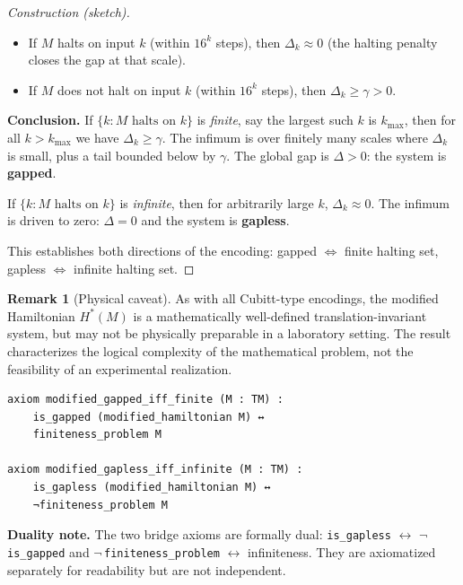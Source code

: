 \documentclass[11pt,a4paper]{article}
\theoremstyle{plain}
\theoremstyle{definition}
\newtheorem{remark}[theorem]{Remark}
\begin{document}
\begin{proof}[Construction (sketch)]
\begin{itemize}[nosep]
\item If $M$ halts on input $k$ (within $16^k$ steps),
  then $\Delta_k \approx 0$ (the halting penalty closes
  the gap at that scale).
\item If $M$ does not halt on input $k$ (within $16^k$ steps),
  then $\Delta_k \geq \gamma > 0$.
\end{itemize}

\medskip\noindent
\textbf{Conclusion.}
If $\{k : M \text{ halts on } k\}$ is \emph{finite},
say the largest such $k$ is $k_{\max}$, then for all
$k > k_{\max}$ we have $\Delta_k \geq \gamma$.
The infimum is over finitely many scales where
$\Delta_k$ is small, plus a tail bounded below by $\gamma$.
The global gap is $\Delta > 0$: the system is \textbf{gapped}.

If $\{k : M \text{ halts on } k\}$ is \emph{infinite}, then
for arbitrarily large $k$, $\Delta_k \approx 0$.
The infimum is driven to zero: $\Delta = 0$ and the system
is \textbf{gapless}.

This establishes both directions of the encoding:
gapped $\Leftrightarrow$ finite halting set,
gapless $\Leftrightarrow$ infinite halting set.
\end{proof}

\begin{remark}[Physical caveat]\label{rem:caveat}
As with all Cubitt-type encodings, the modified
Hamiltonian $H^*(M)$ is a mathematically well-defined
translation-invariant system, but may not be physically
preparable in a laboratory setting.  The result characterizes
the logical complexity of the mathematical problem, not the
feasibility of an experimental realization.
\end{remark}

\begin{lstlisting}[caption={Modified encoding bridges: \texttt{ModifiedEncoding.lean}}]
axiom modified_gapped_iff_finite (M : TM) :
    is_gapped (modified_hamiltonian M) ↔
    finiteness_problem M

axiom modified_gapless_iff_infinite (M : TM) :
    is_gapless (modified_hamiltonian M) ↔
    ¬finiteness_problem M
\end{lstlisting}

\noindent\textbf{Duality note.}
The two bridge axioms are formally dual:
\texttt{is\_gapless} $\leftrightarrow$ $\lnot$\,\texttt{is\_gapped}
and $\lnot$\,\texttt{finiteness\_problem}
$\leftrightarrow$ infiniteness.
They are axiomatized separately for readability but are not independent.
\end{document}
